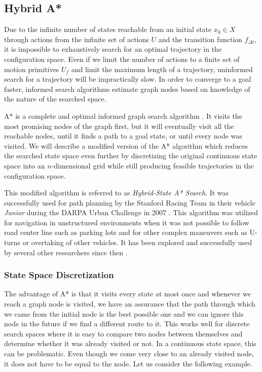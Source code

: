 \subsection{Hybrid A*}

Due to the infinite number of states reachable from an initial state $x_0\in X$ through actions from the infinite set of actions $U$ and the transition function $f_{\Delta t}$, it is impossible to exhaustively search for an optimal trajectory in the configuration space. Even if we limit the number of actions to a finite set of motion primitives $U_f$ and limit the maximum length of a trajectory, uninformed search for a trajectory will be impractically slow. In order to converge to a goal faster, informed search algorithms estimate graph nodes based on knowledge of the nature of the searched space.

A* is a complete and optimal informed graph search algorithm \cite{Nilsson_astar}. It visits the most promising nodes of the graph first, but it will eventually visit all the reachable nodes, until it finds a path to a goal state, or until every node was visited. We will describe a modified version of the A* algorithm which reduces the searched state space even further by discretizing the original continuous state space into an $n$-dimensional grid while still producing feasible trajectories in the configuration space.

This modified algorithm is referred to as \textit{Hybrid-State A* Search}. It was successfully used for path planning by the Stanford Racing Team in their vehicle \textit{Junior} during the DARPA Urban Challenge in 2007 \cite{dolgov08gppSTAIR}. This algorithm was utilized for navigation in unstructured environments when it was not possible to follow road center line such as parking lots and for other complex maneuvers such as U-turns or overtaking of other vehicles. It has been explored and successfully used by several other researchers since then \cite{Hybrid_astar}.

\subsubsection{State Space Discretization}

The advantage of A* is that it visits every state at most once and whenever we reach a graph node is visited, we have an assurance that the path through which we came from the initial node is the best possible one and we can ignore this node in the future if we find a different route to it. This works well for discrete search spaces where it is easy to compare two nodes between themselves and determine whether it was already visited or not. In a continuous state space, this can be problematic. Even though we come very close to an already visited node, it does not have to be equal to the node. Let us consider the following example.

